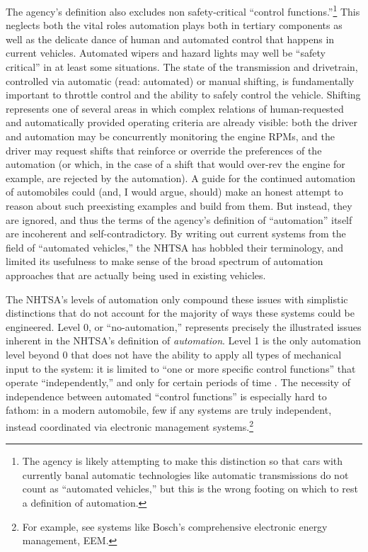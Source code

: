 The agency's definition also excludes non safety-critical ``control
functions.''\footnote{The agency is likely attempting to make this distinction
so that cars with currently banal automatic technologies like
automatic transmissions do 
not count as ``automated vehicles,'' but this is the wrong footing on
which to rest a definition of automation.} This neglects both the
vital roles automation plays both in tertiary components as well as
the delicate dance of human and automated control that happens in
current vehicles. Automated wipers and hazard
lights may well be ``safety critical'' in at least some situations.
The state of the transmission 
and drivetrain, controlled via automatic (read: automated) or manual
shifting, is fundamentally important to throttle control and the
ability to safely control the vehicle. Shifting represents one of
several areas
in which complex relations of human-requested and
automatically provided operating criteria are already visible: both
the driver and automation may be concurrently monitoring the engine
RPMs, and the driver may request shifts that reinforce or override the
preferences of the automation (or which, in the case of a shift that would
over-rev the engine for example, are rejected by the automation). A guide for the
continued automation of automobiles could (and, I would argue, should)
make an honest attempt to reason about such preexisting examples and
build from them. But instead, they are ignored, and thus the
terms of the agency's definition of ``automation'' itself are incoherent
and self-contradictory. By writing out current systems from the field
of ``automated vehicles,'' the NHTSA has hobbled their terminology,
and limited its usefulness to make sense of the broad spectrum of automation
approaches that are actually being used in existing vehicles.


The NHTSA's levels of automation only compound these
issues with simplistic distinctions that do not account for the
majority of ways these systems could be engineered. Level 0, or
``no-automation,'' represents 
precisely the illustrated issues inherent in the NHTSA's definition of
\emph{automation}. Level 
1 is the only automation level beyond 0 that does not have the
ability to apply all types of mechanical input to the system: it is
limited to ``one or more specific control functions'' that operate
``independently,'' and only for certain periods of time \cite[p. 4]{NHTSA}. The
necessity of independence between automated ``control functions'' is
especially hard to fathom: in a modern automobile, few if any systems
are truly independent, instead coordinated via electronic management
systems.\footnote{For example, see systems like Bosch's comprehensive
  electronic energy management, EEM.} 


